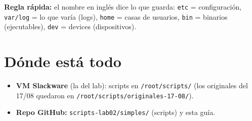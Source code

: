 \textbf{Regla rápida:} el nombre en inglés dice lo que guarda: \texttt{etc} = configuración, \texttt{var/log} = lo que varía (logs), \texttt{home} = casas de usuarios, \texttt{bin} = binarios (ejecutables), \texttt{dev} = devices (dispositivos).

\section*{Dónde está todo}

\begin{itemize}
  \item \textbf{VM Slackware} (la del lab): scripts en \texttt{/root/scripts/} (los originales del 17/08 quedaron en \texttt{/root/scripts/originales-17-08/}).
  \item \textbf{Repo GitHub:} \texttt{scripts-lab02/simples/} (scripts) y esta guía.
\end{itemize}

